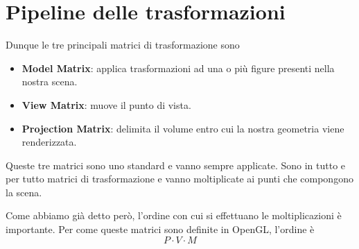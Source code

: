 \section{Pipeline delle trasformazioni}
Dunque le tre principali matrici di trasformazione sono
\begin{itemize}
	\item \textbf{Model Matrix}: applica trasformazioni ad una o pi\`u figure presenti nella nostra scena.
	\item \textbf{View Matrix}: muove il punto di vista.
	\item \textbf{Projection Matrix}: delimita il volume entro cui la nostra geometria viene renderizzata.
\end{itemize}
Queste tre matrici sono uno standard e vanno sempre applicate. Sono in tutto e per tutto matrici di trasformazione e
vanno moltiplicate ai punti che compongono la scena.

Come abbiamo gi\`a detto per\`o, l'ordine con cui si effettuano le moltiplicazioni \`e importante. Per come queste
matrici sono definite in OpenGL, l'ordine \`e
\[ P \cdot V \cdot M \]
